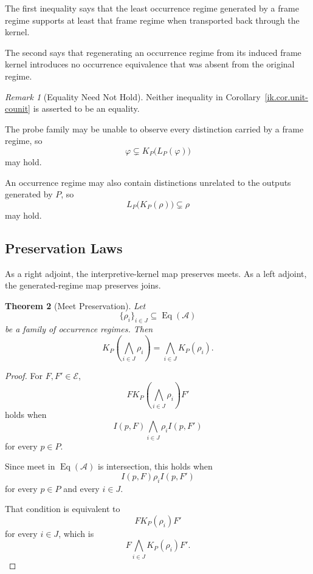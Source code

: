 \documentclass[11pt]{article}
\theoremstyle{plain}
\newtheorem{theorem}{Theorem}[section]
\theoremstyle{definition}
\theoremstyle{remark}
\newtheorem{remark}[theorem]{Remark}
\begin{document}
The first inequality says that
the least occurrence regime generated by a frame regime
supports at least that frame regime
when transported back through the kernel.

The second says that
regenerating an occurrence regime
from its induced frame kernel
introduces no occurrence equivalence
that was absent from the original regime.

\begin{remark}[Equality Need Not Hold]
  \label{ik.rem.unit-counit-strict}
  Neither inequality in
  Corollary~\ref{ik.cor.unit-counit}
  is asserted to be an equality.

  The probe family may be unable to observe
  every distinction carried by a frame regime,
  so
  \[
    \varphi
    \subsetneq
    K_P
    \bigl(
    L_P(\varphi)
    \bigr)
  \]
  may hold.

  An occurrence regime may also contain distinctions
  unrelated to the outputs generated by \(P\),
  so
  \[
    L_P
    \bigl(
    K_P(\rho)
    \bigr)
    \subsetneq
    \rho
  \]
  may hold.
\end{remark}

\subsection{Preservation Laws}

As a right adjoint,
the interpretive-kernel map preserves meets.
As a left adjoint,
the generated-regime map preserves joins.

\begin{theorem}[Meet Preservation]
  \label{ik.thm.kernel-meets}
  Let
  \[
    \{
    \rho_i
    \}_{i\in J}
    \subseteq
    \operatorname{Eq}(\mathcal{A})
  \]
  be a family of occurrence regimes.
  Then
  \[
    K_P
    \left(
    \bigwedge_{i\in J}
    \rho_i
    \right)
    =
    \bigwedge_{i\in J}
    K_P(\rho_i).
  \]
\end{theorem}

\begin{proof}
  For \(F,F'\in\mathcal{E}\),
  \[
    F
    \mathrel{
      K_P
      \left(
      \bigwedge_{i\in J}
      \rho_i
      \right)
    }
    F'
  \]
  holds when
  \[
    I(p,F)
    \mathrel{
      \bigwedge_{i\in J}
      \rho_i
    }
    I(p,F')
  \]
  for every \(p\in P\).

  Since meet in
  \(\operatorname{Eq}(\mathcal{A})\)
  is intersection,
  this holds when
  \[
    I(p,F)
    \mathrel{\rho_i}
    I(p,F')
  \]
  for every \(p\in P\) and every \(i\in J\).

  That condition is equivalent to
  \[
    F
    \mathrel{K_P(\rho_i)}
    F'
  \]
  for every \(i\in J\),
  which is
  \[
    F
    \mathrel{
      \bigwedge_{i\in J}
      K_P(\rho_i)
    }
    F'.
  \]
\end{proof}
\end{document}
